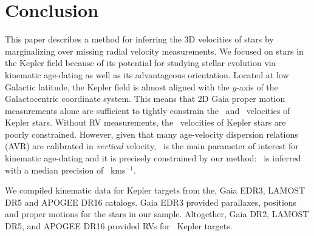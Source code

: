 \section{Conclusion}

This paper describes a method for inferring the 3D velocities of stars by
marginalizing over missing radial velocity measurements.
We focused on stars in the Kepler field because of its potential for studying
stellar evolution via kinematic age-dating as well as its advantageous
orientation.
Located at low Galactic latitude, the Kepler field is almost aligned with the
$y$-axis of the Galactocentric coordinate system.
This means that 2D Gaia proper motion measurements alone are sufficient to
tightly constrain the \vx\ and \vz\ velocities of Kepler stars.
Without RV measurements, the \vy\ velocities  of Kepler stars are
poorly constrained.
However, given that many age-velocity dispersion relations (AVR) are
calibrated in {\it vertical} velocity, \vz\ is the main parameter of interest
for kinematic age-dating and it is precisely constrained by our method: \vz\
is inferred with a median precision of \vzprecision\ kms$^{-1}$.

We compiled kinematic data for Kepler targets from the, Gaia EDR3, LAMOST DR5
and APOGEE DR16 catalogs.
Gaia EDR3 provided parallaxes, positions and proper motions for the stars in
our sample.
Altogether, Gaia DR2, LAMOST DR5, and APOGEE DR16 provided RVs for \nrv\
Kepler targets.

